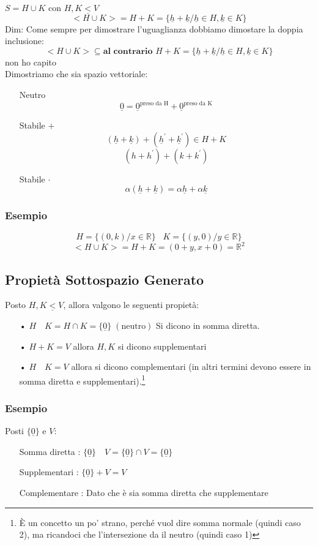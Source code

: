 $ S= H \cup K $ con $H,K \underline{<} V$
$$ <H \cup K> = H+K = \{\underline{h}+\underline{k} / \underline{h} \in H, \underline{k} \in K \} $$
Dim:
Come sempre per dimostrare l'uguaglianza dobbiamo dimostare la doppia inclusione:
$$ <H \cup K> \subseteq \textbf{al contrario } H+K = \{\underline{h}+\underline{k} / \underline{h} \in H, \underline{k} \in K \} $$
non ho capito\\

Dimostriamo che sia spazio vettoriale:
\begin{itemize}
\item[Neutro] $$ \underline{0} = \underline{0}^{\text{preso da H}} + \underline{0}^{\text{preso da K}} $$
\item[Stabile $+$] $$ (\underline{h} + \underline{k}) + (\underline{h}^' + \underline{k}^') \in H+K $$
$$ (h+h^') + (k+k^') $$
\item[Stabile $\cdot$] $$ \alpha(\underline{h}+\underline{k}) = \alpha\underline{h} + \alpha \underline{k}  $$
\end{itemize}

\subsubsection{Esempio}
$$ H=\{(0,k) / x \in \mathbb{R}\} \;\;\; K=\{(y,0) / y \in \mathbb{R} \} $$
$$ <H \cup K> = H+K = (0+y, x+0) = \mathbb{R}^2 $$

\subsection{Propietà Sottospazio Generato}
Posto $H,K \underline{<} V$, allora valgono le seguenti propietà:
\begin{itemize}
\item[•] $ H \quad K = H \cap K = \{ \underline{0} \} \;(\text{neutro}) $ Si dicono in somma diretta.
\item[•] $ H + K = V$ allora $H,K$ si dicono supplementari
\item[•] $ H \quad K = V$ allora si dicono complementari (in altri termini devono essere in somma diretta e supplementari).\footnote{È un concetto un po' strano, perché vuol dire somma normale (quindi caso 2), ma ricandoci che l'intersezione da il neutro (quindi caso 1)}
\end{itemize}

\subsubsection{Esempio}
Posti $\{ \underline{0} \}$ e $V$:
\begin{itemize}
\item[Somma diretta]: $ \{ \underline{0} \} \quad V = \{ \underline{0} \} \cap V = \{ \underline{0} \}$
\item[Supplementari]: $  \{ \underline{0} \} + V = V$
\item[Complementare]: Dato che è sia somma diretta che supplementare
\end{itemize}

